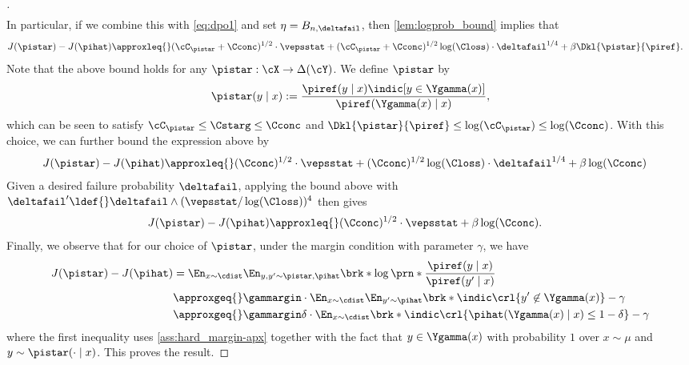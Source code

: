 \begin{proof}[]
\begin{align}
\end{align}
In particular, if we combine this with \cref{eq:dpo1} and set
$\eta=\Brange$, then \cref{lem:logprob_bound} implies that
\begin{align}
J(\pistar) - J(\pihat)
&\approxleq{} (\cC_{\pistar}+\Cconc)^{1/2}\cdot\vepsstat
+(\cC_{\pistar}+\Cconc)^{1/2}\log(\Closs)\cdot\deltafail^{1/4}
+
\beta\Dkl{\pistar}{\piref}.
\end{align}
Note that the above bound holds for any
$\pistar:\cX\to\Delta(\cY)$. We define $\pistar$ by
\[
  \pistar(y\mid
  x):= \frac{\piref(y\mid x) \indic[y \in
    \Ygamma(x)]}{\piref(\Ygamma(x)\mid x)},
\]
which can be seen to satisfy $\cC_{\pistar} \leq{} \Cstarg \leq
\Cconc$ and $\Dkl{\pistar}{\piref} \leq \log(\cC_{\pistar})
\leq \log(\Cconc)$. With this choice, we can further bound the
expression above by
\begin{align}
J(\pistar) - J(\pihat)
&\approxleq{} (\Cconc)^{1/2}\cdot\vepsstat
+(\Cconc)^{1/2}\log(\Closs)\cdot\deltafail^{1/4}
+
\beta\log(\Cconc)\label{eq:dpo2}
\end{align}
Given a desired failure probability $\deltafail$, applying the
bound above with
$\deltafail'\ldef{}\deltafail\wedge{}(\vepsstat/\log(\Closs))^4$
then gives
\begin{align}
J(\pistar) - J(\pihat)
&\approxleq{} (\Cconc)^{1/2}\cdot\vepsstat + \beta\log(\Cconc).
\end{align}
Finally, we observe that for our choice of $\pistar$,
under the margin condition with parameter $\gamma$, we
have
\begin{align}
J(\pistar) - J(\pihat)
&=\En_{x\sim\cdist}\En_{y,y'\sim\pistar,\pihat}\brk*{\log\prn*{\frac{\piref(y\mid{}x)}{\piref(y'\mid{}x)}}}\\
&\approxgeq{}\gammargin\cdot\En_{x\sim\cdist}\En_{y'\sim\pihat}\brk*{\indic\crl{y'\not \in \Ygamma(x)}} - \gamma\\
&\approxgeq{}\gammargin\delta\cdot\En_{x\sim\cdist}\brk*{\indic\crl{\pihat(\Ygamma(x)\mid{}x)\leq{}1-\delta}} - \gamma
\end{align}
where the first inequality uses \cref{ass:hard_margin-apx} together with the fact that $y \in \Ygamma(x)$ with probability $1$ over $x\sim \mu$ and $y \sim \pistar(\cdot\mid x)$. This proves the result.

\end{proof}

